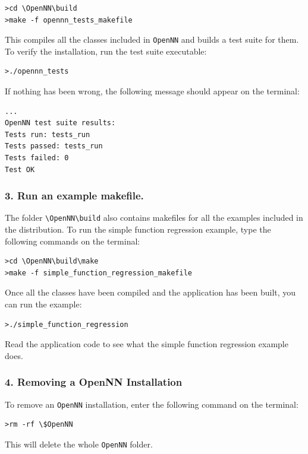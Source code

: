 \begin{lstlisting}
>cd \OpenNN\build
>make -f opennn_tests_makefile
\end{lstlisting}

This compiles all the classes included in \texttt{OpenNN} and builds a test suite for them.
To verify the installation, run the test suite executable:

\begin{lstlisting}
>./opennn_tests
\end{lstlisting}

If nothing has been wrong, the following message should appear on
the terminal:

\begin{lstlisting}
...
OpenNN test suite results:
Tests run: tests_run
Tests passed: tests_run
Tests failed: 0
Test OK
\end{lstlisting}

\subsubsection*{3. Run an example makefile.}

The folder \lstinline"\OpenNN\build" also contains  
makefiles for all the examples included in the distribution. 
To run the simple function regression example, type the following commands on
the terminal:

\begin{lstlisting}
>cd \OpenNN\build\make
>make -f simple_function_regression_makefile 
\end{lstlisting}

Once all the classes have been compiled and the application has been built, 
you can run the example:

\begin{lstlisting}
>./simple_function_regression
\end{lstlisting}

Read the application code to see what the simple function regression example does. 

\subsubsection*{4. Removing a OpenNN Installation}

To remove an \texttt{OpenNN} installation, enter the following command on the terminal:

\begin{lstlisting}
>rm -rf \$OpenNN
\end{lstlisting}

This will delete the whole \texttt{OpenNN} folder.
